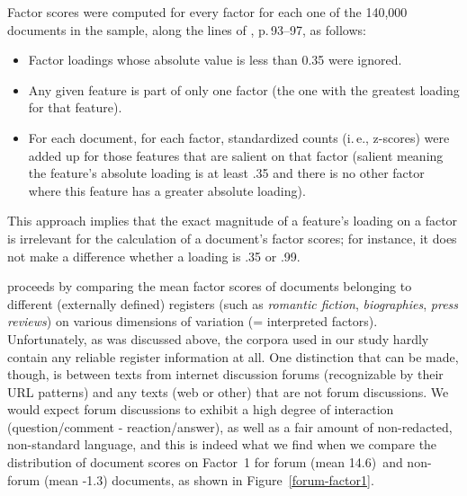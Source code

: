Factor scores were computed for every factor for each one of the 140,000 documents in the sample, along the lines of \cite{Biber1988}, p.\,93--97, as follows:

\begin{itemize}
  \item Factor loadings whose absolute value is less than 0.35 were ignored.
  \item Any given feature is part of only one factor (the one with the greatest loading for that feature).
  \item For each document, for each factor, standardized counts (i.\,e., z-scores) were added up for those features that are salient on that factor (salient meaning the feature's absolute loading is at least .35 and there is no other factor where this feature has a greater absolute loading).
\end{itemize}

This approach implies that the exact magnitude of a feature's  loading on a factor is irrelevant for the calculation of a document's factor scores; for instance, it does not make a difference whether a loading is .35 or .99.

\cite{Biber1988} proceeds by comparing the mean factor scores of documents belonging to different (externally defined) registers (such as \textit{romantic fiction}, \textit{biographies}, \textit{press reviews}) on various dimensions of variation (= interpreted factors).
Unfortunately, as was discussed above, the corpora used in our study hardly contain any reliable register information at all.
One distinction that can be made, though, is between texts from internet discussion forums (recognizable by their URL patterns) and any texts (web or other) that are not forum discussions.
We would expect forum discussions to exhibit a high degree of interaction (question/comment - reaction/answer), as well as a fair amount of non-redacted, non-standard language, and this is indeed what we find when we compare the distribution of document scores on Factor~1 for forum (mean 14.6) and non-forum (mean -1.3) documents, as shown in Figure~\ref{forum-factor1}.

